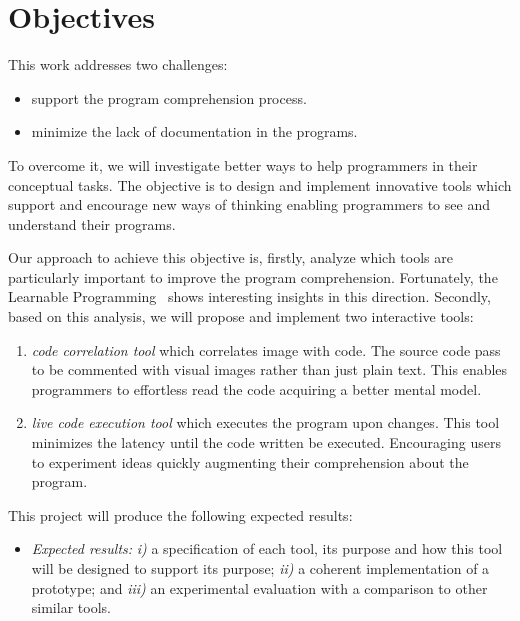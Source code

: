 
% 
% 

\section{Objectives}

This work addresses two challenges:

\begin{itemize}
\item support the program comprehension process.
\item minimize the lack of documentation in the programs.
\end{itemize}

To overcome it, we will investigate better ways to help programmers in their conceptual tasks. The objective is to design and implement innovative tools which support and encourage new ways of thinking enabling programmers to see and understand their programs.

Our approach to achieve this objective is, firstly, analyze which tools are particularly important to improve the program comprehension. Fortunately, the Learnable Programming~\cite{learnableProg,inventingPrin} shows interesting insights in this direction. Secondly, based on this analysis, we will propose and implement two interactive tools: 

\begin{enumerate}
\item \textit{code correlation tool} which correlates image with code. The source code pass to be commented with visual images rather than just plain text. This enables programmers to effortless read the code acquiring a better mental model.
\item \textit{live code execution tool} which executes the program upon changes. This tool minimizes the latency until the code written be executed. Encouraging users to experiment ideas quickly augmenting their comprehension about the program.
\end{enumerate}

This project will produce the following expected results:
 
\begin{itemize}
\item[] \textit{Expected results:} \textit{i)} a specification of each tool, its purpose and how this tool will be designed to support its purpose; \textit{ii)} a coherent implementation of a prototype; and \textit{iii)} an experimental evaluation with a comparison to other similar tools.
\end{itemize}
